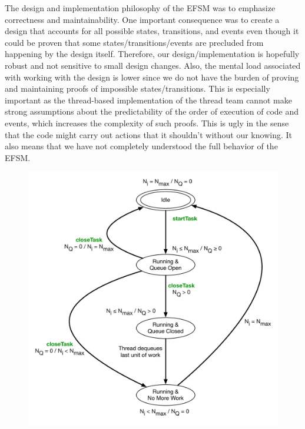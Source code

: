 \documentclass{article}
\begin{document}
The design and implementation philosophy of the EFSM was to emphasize
correctness and maintainability.  One important consequence was to create a
design that accounts for all possible states, transitions, and events even
though it could be proven that some states/transitions/events are precluded from
happening by the design itself.  Therefore, our design/implementation is
hopefully robust and not sensitive to small design changes.  Also, the mental
load associated with working with the design is lower since we do not have the
burden of proving and maintaining proofs of impossible states/transitions.  This
is especially important as the thread-based implementation of the thread team
cannot make strong assumptions about the predictability of the order of
execution of code and events, which increases the complexity of such proofs.
This is ugly in the sense that the code might carry out actions that it
shouldn't without our knowing.  It also means that we have not completely
understood the full behavior of the EFSM.

\begin{figure}[!ht]
\begin{center}
\includegraphics[width=5.0in]{TeamStates.pdf}
\caption[]{}
\label{fig:TeamStateDiagram}
\end{center}
\end{figure}
\end{document}
